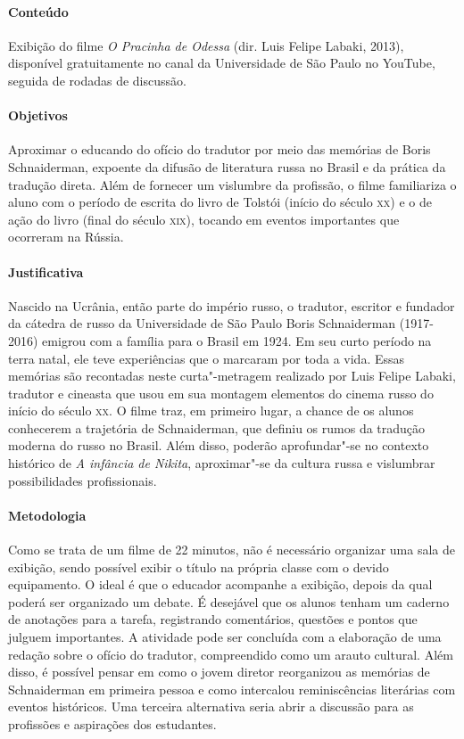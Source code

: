 \documentclass[11pt]{extarticle}
\begin{document}
\paragraph{Conteúdo}
Exibição do filme \emph{O Pracinha de Odessa} (dir. Luis Felipe Labaki,
2013), disponível gratuitamente no canal da Universidade de São Paulo no
YouTube, seguida de rodadas de discussão.

\paragraph{Objetivos}
Aproximar o educando do ofício do tradutor por meio das memórias de
Boris Schnaiderman, expoente da difusão de literatura russa no Brasil e
da prática da tradução direta. Além de fornecer um vislumbre da
profissão, o filme familiariza o aluno com o período de escrita do livro
de Tolstói (início do século \textsc{xx}) e o de ação do livro (final do século
\textsc{xix}), tocando em eventos importantes que ocorreram na Rússia.

\paragraph{Justificativa}
Nascido na Ucrânia, então parte do império russo, o tradutor, escritor e
fundador da cátedra de russo da Universidade de São Paulo Boris
Schnaiderman (1917-2016) emigrou com a família para o Brasil em 1924. Em
seu curto período na terra natal, ele teve experiências que o marcaram
por toda a vida. Essas memórias são recontadas neste curta"-metragem
realizado por Luis Felipe Labaki, tradutor e cineasta que usou em sua
montagem elementos do cinema russo do início do século \textsc{xx}. O filme traz,
em primeiro lugar, a chance de os alunos conhecerem a trajetória de
Schnaiderman, que definiu os rumos da tradução moderna do russo no
Brasil. Além disso, poderão aprofundar"-se no contexto histórico de
\emph{A infância de Nikita}, aproximar"-se da cultura russa e vislumbrar
possibilidades profissionais.


\paragraph{Metodologia}
Como se trata de um filme de 22 minutos, não é necessário organizar uma
sala de exibição, sendo possível exibir o título na própria classe com o devido equipamento. O ideal é que o educador acompanhe a exibição,
depois da qual poderá ser organizado um debate. É desejável que os
alunos tenham um caderno de anotações para a tarefa, registrando
comentários, questões e pontos que julguem importantes. A atividade pode
ser concluída com a elaboração de uma redação sobre o ofício do
tradutor, compreendido como um arauto cultural. Além disso, é possível
pensar em como o jovem diretor reorganizou as memórias de Schnaiderman
em primeira pessoa e como intercalou reminiscências literárias com
eventos históricos. Uma terceira alternativa seria abrir a discussão
para as profissões e aspirações dos estudantes.
\end{document}
